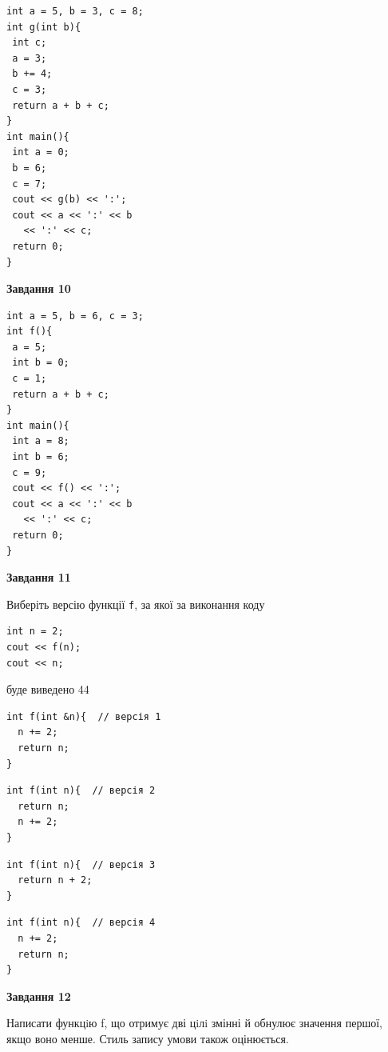 \documentclass[12pt, ukrainian]{article}
\def\code#1{\Verb!#1!}
\begin{document}
{\begin {large}
\begin{minipage}[t]{7.0cm}
\begin{verbatim}
int a = 5, b = 3, c = 8;
int g(int b){
 int c;
 a = 3;
 b += 4;
 c = 3;
 return a + b + c;
}
int main(){
 int a = 0;
 b = 6;
 c = 7;
 cout << g(b) << ':';
 cout << a << ':' << b 
   << ':' << c;
 return 0;
}
\end{verbatim}



\begin{center}
\textbf{Завдання 10}
\end{center}
\vspace{-8mm}

\begin{verbatim}
int a = 5, b = 6, c = 3;
int f(){
 a = 5;
 int b = 0;
 c = 1;
 return a + b + c;
}
int main(){
 int a = 8;
 int b = 6;
 c = 9;
 cout << f() << ':';
 cout << a << ':' << b 
   << ':' << c;
 return 0;
}
\end{verbatim}

\end{minipage}
\vline \hspace{1mm}
\begin{minipage}[t]{11.0cm}

\begin{center}
\textbf{Завдання 11}
\end{center}
Виберіть версію функції \code{f}, за якої за виконання коду
\begin{verbatim}
int n = 2;
cout << f(n);
cout << n;
\end{verbatim}

буде виведено 44

\begin{verbatim}
int f(int &n){  // версія 1
  n += 2;
  return n;
}
\end{verbatim}

\vspace{-8mm}\begin{verbatim}
int f(int n){  // версія 2
  return n;
  n += 2;
}
\end{verbatim}

\vspace{-8mm}\begin{verbatim}
int f(int n){  // версія 3
  return n + 2;
}
\end{verbatim}

\vspace{-8mm}\begin{verbatim}
int f(int n){  // версія 4
  n += 2;
  return n;
}
\end{verbatim}



\begin{center}
\textbf{Завдання 12}
\end{center}

Написати функцiю f, що отримує дві цiлi змінні й обнулює значення першої, якщо воно менше. Стиль запису умови також оцінюється.\par

\end{minipage}

\end {large}}
\newpage
\end{document}
